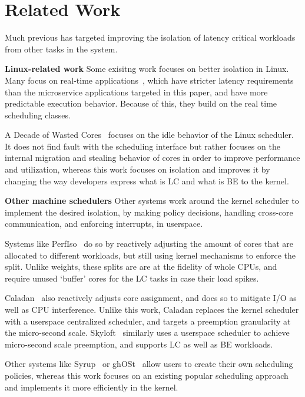 \section{Related Work}

Much previous has targeted improving the isolation of latency critical workloads
from other tasks in the system.

\textbf{Linux-related work} Some exisitng work focuses on better isolation in
Linux. Many focus on real-time applications~\cite{rt-in-linux, state-rt-linux},
which have stricter latency requirements than the microservice applications
targeted in this paper, and have more predictable execution behavior. Because of
this, they build on the real time scheduling classes.

A Decade of Wasted Cores~\cite{wasted-cores} focuses on the idle behavior of the
Linux scheduler. It does not find fault with the scheduling interface but rather
focuses on the internal migration and stealing behavior of cores in order to
improve performance and utilization, whereas this work focuses on isolation and
improves it by changing the way developers express what is LC and what is BE to
the kernel.

\textbf{Other machine schedulers} Other systems work around the kernel scheduler
to implement the desired isolation, by making policy decisions, handling
cross-core communication, and enforcing interrupts, in userspace.

Systems like PerfIso~\cite{perfiso} do so by reactively adjusting the amount of
cores that are allocated to different workloads, but still using kernel
mechanisms to enforce the split. Unlike \cgroups{} weights, these splits are are
at the fidelity of whole CPUs, and require unused `buffer' cores for the LC
tasks in case their load spikes.

Caladan~\cite{caladan} also reactively adjusts core assignment, and does so to
mitigate I/O as well as CPU interference. Unlike this work, Caladan replaces the
kernel scheduler with a userspace centralized scheduler, and targets a
preemption granularity at the micro-second scale. Skyloft~\cite{skyloft}
similarly uses a userspace scheduler to achieve micro-second scale preemption,
and supports LC as well as BE workloads.

Other systems like Syrup~\cite{syrup} or ghOSt~\cite{ghost} allow users to
create their own scheduling policies, whereas this work focuses on an existing
popular scheduling approach and implements it more efficiently in the kernel. 



